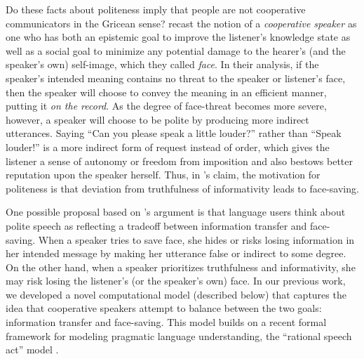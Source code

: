 Do these facts about politeness imply that people are not cooperative communicators in the Gricean sense? \citet{Brown1987} recast the notion of a \emph{cooperative speaker} as one who has both an epistemic goal to improve the listener's knowledge state as well as a social goal to minimize any potential damage to the hearer's (and the speaker's own) self-image, which they called \emph{face}. In their analysis, if the speaker's intended meaning contains no threat to the speaker or listener's face, then the speaker will choose to convey the meaning in an efficient manner, putting it \emph{on the record}. As the degree of face-threat becomes more severe, however, a speaker will choose to be polite by producing more indirect utterances. Saying ``Can you please speak a little louder?'' rather than ``Speak louder!'' is a more indirect form of request instead of order, which gives the listener a sense of autonomy or freedom from imposition and also bestows better reputation upon the speaker herself. Thus, in \citet{Brown1987}'s claim, the motivation for politeness is that deviation from truthfulness of informativity leads to face-saving. 

One possible proposal based on \citet{Brown1987}'s argument is that language users think about polite speech as reflecting a tradeoff between information transfer and face-saving. When a speaker tries to save face, she hides or risks losing information in her intended message by making her utterance false or indirect to some degree. On the other hand, when a speaker prioritizes truthfulness and informativity, she may risk losing the listener's (or the speaker's own) face. In our previous work, we developed a novel computational model (described below) that captures the idea that cooperative speakers attempt to balance between the two goals: information transfer and face-saving. This model builds on a recent formal framework for modeling pragmatic language understanding, the ``rational speech act''  model \citep{Frank2012, Goodman2013}. 


